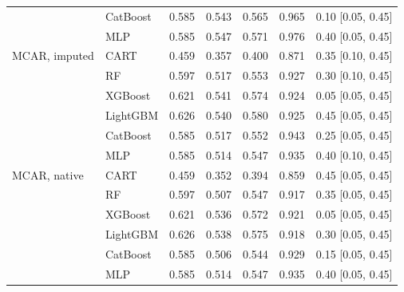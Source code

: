 \documentclass[pdflatex,sn-mathphys]{sn-jnl}
\theoremstyle{thmstyleone}
\begin{document}
\begin{table}[htbp]
\begin{tabular}{@{}llrrrrl@{}}
 & CatBoost & 0.585 & 0.543 & 0.565 & 0.965 & 0.10 [0.05, 0.45] \\
 & MLP & 0.585 & 0.547 & 0.571 & 0.976 & 0.40 [0.05, 0.45] \\
\midrule
MCAR, imputed & CART & 0.459 & 0.357 & 0.400 & 0.871 & 0.35 [0.10, 0.45] \\
 & RF & 0.597 & 0.517 & 0.553 & 0.927 & 0.30 [0.10, 0.45] \\
 & XGBoost & 0.621 & 0.541 & 0.574 & 0.924 & 0.05 [0.05, 0.45] \\
 & LightGBM & 0.626 & 0.540 & 0.580 & 0.925 & 0.45 [0.05, 0.45] \\
 & CatBoost & 0.585 & 0.517 & 0.552 & 0.943 & 0.25 [0.05, 0.45] \\
 & MLP & 0.585 & 0.514 & 0.547 & 0.935 & 0.40 [0.10, 0.45] \\
\midrule
MCAR, native & CART & 0.459 & 0.352 & 0.394 & 0.859 & 0.45 [0.05, 0.45] \\
 & RF & 0.597 & 0.507 & 0.547 & 0.917 & 0.35 [0.05, 0.45] \\
 & XGBoost & 0.621 & 0.536 & 0.572 & 0.921 & 0.05 [0.05, 0.45] \\
 & LightGBM & 0.626 & 0.538 & 0.575 & 0.918 & 0.30 [0.05, 0.45] \\
 & CatBoost & 0.585 & 0.506 & 0.544 & 0.929 & 0.15 [0.05, 0.45] \\
 & MLP & 0.585 & 0.514 & 0.547 & 0.935 & 0.40 [0.05, 0.45] \\
\bottomrule
\end{tabular}
\end{table}

\clearpage
\end{document}
